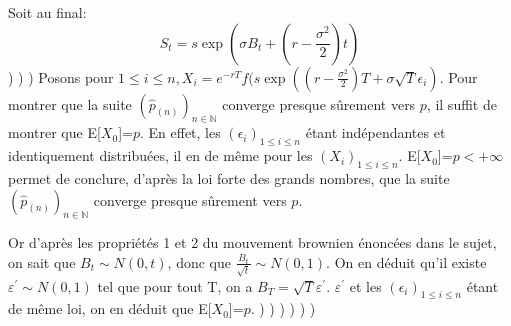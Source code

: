 \documentclass{exam}
\begin{document}
\newline
\espace
Soit au final:
\newline
\espace
$$\boxed{S_t=s \exp{(\sigma B_t + (r-\frac{\sigma^2}{2})t)}}$$
\newline
{})
\newline
{})
\newline
{}) Posons pour $1 \leq i \leq n, X_i = e^{-rT}f(s \exp ((r-\frac{\sigma^2}{2})T + \sigma \sqrt{T} \epsilon_i)$. Pour montrer que la suite $(\hat{p}_{(n)})_{n \in \mathbb{N}}$ converge presque sûrement vers $p$, il suffit de montrer que E[$X_0$]=$p$. En effet, les $(\epsilon_i)_{1 \leq i \leq n}$ étant indépendantes et identiquement distribuées, il en de même pour les $(X_i)_{1 \leq i \leq n}$. E[$X_0$]=$p < +\infty$ permet de conclure, d'après la loi forte des grands nombres, que la suite $(\hat{p}_{(n)})_{n \in \mathbb{N}}$ converge presque sûrement vers $p$. 

Or d'après les propriétés 1 et 2 du mouvement brownien énoncées dans le sujet, on sait que $B_t \sim N(0,t)$, donc que $\frac{B_t}{\sqrt{t}} \sim N(0,1)$. On en déduit qu'il existe $\varepsilon^{'} \sim N(0,1)$ tel que pour tout T, on a $B_T = \sqrt{T}\varepsilon^{'}$. $\varepsilon^{'}$ et les $(\epsilon_i)_{1 \leq i \leq n}$ étant de même loi, on en déduit que  E[$X_0$]=$p$.
\newline
{})
\newline
{})
\newline
{})
\newline
{})
\newline
{})
\newline
{})
\end{document}
